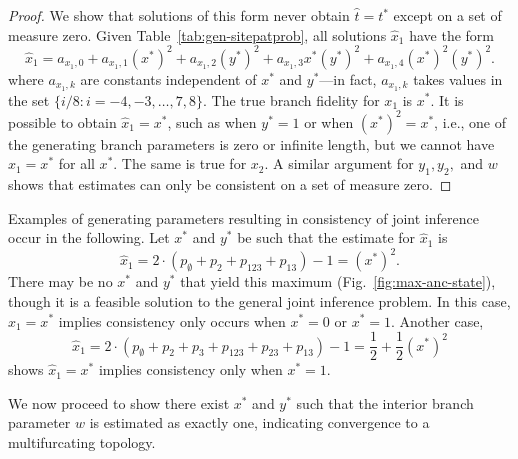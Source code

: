 \begin{proof}
We show that solutions of this form never obtain $\hat{t} = t^*$ except on a set of measure zero.
Given Table~\ref{tab:gen-sitepatprob}, all solutions $\hat{x}_1$ have the form
\[
\hat{x}_1 = a_{x_1,0} + a_{x_1,1}(x^*)^2 + a_{x_1,2}(y^*)^2 + a_{x_1,3} x^*(y^*)^2 + a_{x_1,4}(x^*)^2(y^*)^2.
\]
where $a_{x_1,k}$ are constants independent of $x^*$ and $y^*$---in fact, $a_{x_1,k}$ takes values in the set $\{i/8 : i=-4,-3,\ldots,7,8\}$.
The true branch fidelity for $x_1$ is $x^*$.
It is possible to obtain $\hat{x}_1=x^*$, such as when $y^*=1$ or when $(x^*)^2=x^*$, i.e., one of the generating branch parameters is zero or infinite length, but we cannot have $\hat{x}_1=x^*$ for all $x^*$.
The same is true for $x_2$.
A similar argument for $y_1,y_2,$ and $w$ shows that estimates can only be consistent on a set of measure zero.
\end{proof}

Examples of generating parameters resulting in consistency of joint inference occur in the following.
Let $x^*$ and $y^*$ be such that the estimate for $\hat{x}_1$ is
\[
\hat{x}_1 = 2 \cdot \left(p_{\emptyset} + p_2 + p_{123} + p_{13}\right) - 1 = (x^*)^2.
\]
There may be no $x^*$ and $y^*$ that yield this maximum (Fig.~\ref{fig:max-anc-state}), though it is a feasible solution to the general joint inference problem.
In this case, $\hat{x}_1 = x^*$ implies consistency only occurs when $x^*=0$ or $x^*=1$.
Another case,
\[
\hat{x}_1 = 2 \cdot \left(p_{\emptyset} + p_2 + p_{3} + p_{123} + p_{23} + p_{13}\right) - 1 = \frac{1}{2} + \frac{1}{2}(x^*)^2
\]
shows $\hat{x}_1 = x^*$ implies consistency only when $x^*=1$.

We now proceed to show there exist $x^*$ and $y^*$ such that the interior branch parameter $w$ is estimated as exactly one, indicating convergence to a multifurcating topology.

\topoInconsist*

